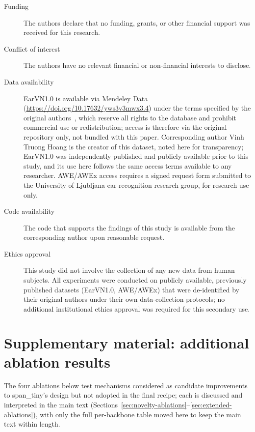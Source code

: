 \documentclass[11pt]{article}
\begin{document}
\begin{description}
\item[Funding] The authors declare that no funding, grants, or other financial support was received for this research.
\item[Conflict of interest] The authors have no relevant financial or non-financial interests to disclose.
\item[Data availability] EarVN1.0 is available via Mendeley Data (\url{https://doi.org/10.17632/yws3v3mwx3.4}) under the terms specified by the original authors~\cite{hoang2019earvn}, which reserve all rights to the database and prohibit commercial use or redistribution; access is therefore via the original repository only, not bundled with this paper. Corresponding author Vinh Truong Hoang is the creator of this dataset, noted here for transparency; EarVN1.0 was independently published and publicly available prior to this study, and its use here follows the same access terms available to any researcher. AWE/AWEx access requires a signed request form submitted to the University of Ljubljana ear-recognition research group, for research use only.
\item[Code availability] The code that supports the findings of this study is available from the corresponding author upon reasonable request.
\item[Ethics approval] This study did not involve the collection of any new data from human subjects. All experiments were conducted on publicly available, previously published datasets (EarVN1.0, AWE/AWEx) that were de-identified by their original authors under their own data-collection protocols; no additional institutional ethics approval was required for this secondary use.
\end{description}

\appendix
\section{Supplementary material: additional ablation results}
\label{sec:supplementary}

The four ablations below test mechanisms considered as candidate improvements to span\_tiny's design but not adopted in the final recipe; each is discussed and interpreted in the main text (Sections~\ref{sec:novelty-ablations}--\ref{sec:extended-ablations}), with only the full per-backbone table moved here to keep the main text within length.
\end{document}
